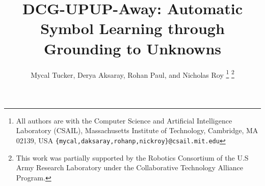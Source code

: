 

\title{DCG-UPUP-Away: Automatic Symbol Learning through Grounding to Unknowns}
\author{Mycal Tucker, Derya Aksaray, Rohan Paul, and Nicholas Roy%
\thanks{All authors are with the Computer Science and Artificial Intelligence Laboratory (CSAIL),
Massachusetts Institute of Technology, Cambridge, MA 02139, USA
{\tt\small \{mycal,daksaray,rohanp,nickroy\}@csail.mit.edu}}%
\thanks{This work was partially supported by the Robotics Consortium of the U.S Army Research Laboratory under the Collaborative Technology Alliance Program.}%
}


\maketitle
\thispagestyle{empty}
\pagestyle{empty}

\begin{abstract}

\end{abstract}












